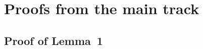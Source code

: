 \documentclass[letterpaper]{article} %
\newcommand{\pair}[1]{(#1)}
\newcommand{\bmlambda}{\bm{\lambda}}
\begin{document}


\section{Proofs from the main track} %
\label{sec:technical_proofs}

\subsection{Proof of Lemma~1} %
\label{sub:proof_of_lemma_}
\end{document}

